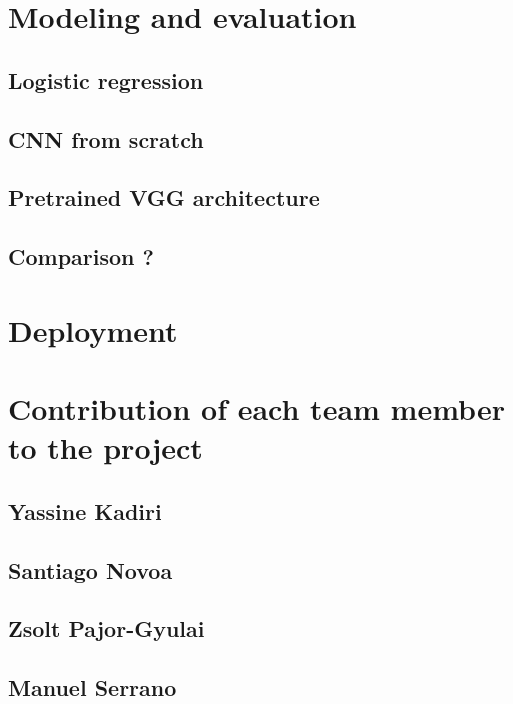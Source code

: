 \documentclass{article}
\begin{document}
\section{Modeling and evaluation}
\subsection{Logistic regression}
\subsection{CNN from scratch}
\subsection{Pretrained VGG architecture}
\subsection{Comparison ?}
\section{Deployment}
\appendix
\section{Contribution of each team member to the project}
\subsection{Yassine Kadiri}
\subsection{Santiago Novoa}
\subsection{Zsolt Pajor-Gyulai}
\subsection{Manuel Serrano}
\end{document}

